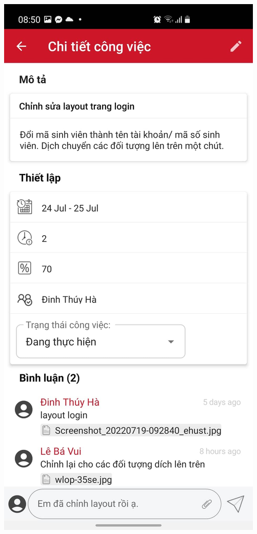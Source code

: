 \documentclass[../Main.tex]{subfiles}
\begin{document}
\begin{minipage}{0.5\textwidth}
\includegraphics[width=0.7\linewidth]{Figure/screen/comment.jpeg}
 \label{Figure/screen/information_topic.jpeg}
\end{minipage}
\hspace{\fill}
\end{document}
